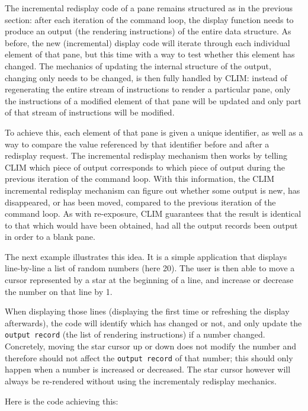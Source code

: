The incremental redisplay code of a pane remains structured as in the
previous section: after each iteration of the command loop, the
display function needs to produce an output (the rendering
instructions) of the entire data structure. As before, the new
(incremental) display code will iterate through each individual
element of that pane, but this time with a way to test whether this
element has changed. The mechanics of updating the internal structure
of the output, changing only needs to be changed, is then fully
handled by CLIM: instead of regenerating the entire stream of
instructions to render a particular pane, only the instructions of a
modified element of that pane will be updated and only part of that
stream of instructions will be modified.

To achieve this, each element of that pane is given a unique
identifier, as well as a way to compare the value referenced by that
identifier before and after a redisplay request.  The incremental
redisplay mechanism then works by telling CLIM which piece of output
corresponds to which piece of output during the previous iteration of
the command loop. With this information, the CLIM incremental
redisplay mechanism can figure out whether some output is new, has
disappeared, or has been moved, compared to the previous iteration of
the command loop.  As with re-exposure, CLIM guarantees that the
result is identical to that which would have been obtained, had all
the output records been output in order to a blank pane.

The next example illustrates this idea.  It is a simple application
that displays line-by-line a list of random numbers (here 20). The
user is then able to move a cursor represented by a star at the
beginning of a line, and increase or decrease the number on that line
by 1.

When displaying those lines (displaying the first time or refreshing
the display afterwards), the code will identify which has changed or
not, and only update the \texttt{output record} (the list of rendering
instructions) if a number changed. Concretely, moving the star cursor
up or down does not modify the number and therefore should not affect
the \texttt{output record} of that number; this should only happen
when a number is increased or decreased. The star cursor however will
always be re-rendered without using the incrementaly redisplay
mechanics.


Here is the code achieving this:



